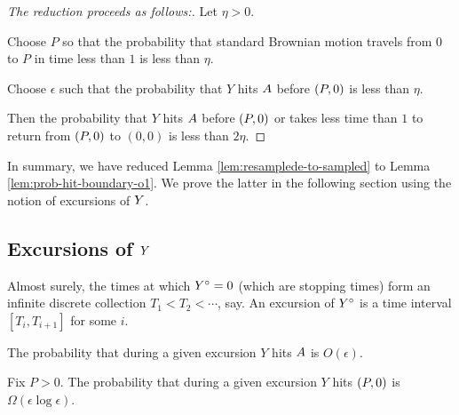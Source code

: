 {\newcommand{\origin}{(0,0)}

\begin{proof}[The reduction proceeds as follows:]

  Let $\eta > 0$.

  Choose $P$ so that the probability that standard Brownian motion
  travels from $0$ to $P$ in time less than $1$ is less than
  $\eta$.

  Choose $\epsilon$ such that the probability that $Y$ hits
  $A$ before $(P,0)$ is less than $\eta$.

  Then the probability that $Y$ hits $A$ before $(P,0)$
  or takes less time than $1$ to return from $(P,0)$ to $\origin$ is
  less than $2\eta$.

\end{proof}

In summary, we have reduced Lemma \ref{lem:resamplede-to-sampled} to
Lemma \ref{lem:prob-hit-boundary-o1}. We prove the latter in the
following section using the notion of excursions of $Y$.

\subsection{Excursions of $Y$}

\newcommand{\excursionstart}{T}

\begin{definition*}
  Almost surely, the times at which $Y^\circ = 0$ (which are stopping
  times) form an infinite discrete collection $\excursionstart_1 <
  \excursionstart_2 < \cdots$, say.  An excursion of $Y^\circ$ is a
  time interval $[\excursionstart_i, \excursionstart_{i+1}]$ for some
  $i$.
\end{definition*}

\newcommand{\Omegaeloge}{\Omega(\epsilon\log\epsilon)}

\newcommand{\probexcursion}[2]{The probability that during a given
  excursion #1 is #2.}

\begin{lemma}
  \label{lem:Phitboundaryline}
  \probexcursion{$Y$ hits $A$}{$O(\epsilon)$}
\end{lemma}

\begin{lemma}
  \label{lem:Pabsorbedandtravelsfar}
  Fix $P > 0$. \probexcursion{$Y$ hits $(P,0)$}{$\Omegaeloge$}
\end{lemma}

}
